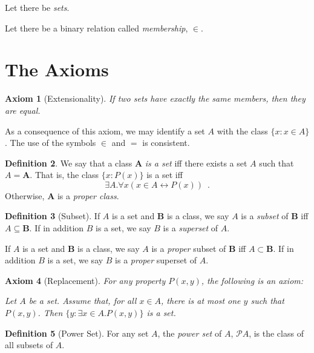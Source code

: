 \documentclass{report}
\newtheorem{axiom}{Axiom}[section]
\theoremstyle{definition}
\newtheorem{definition}[axiom]{Definition}
\begin{document}
    Let there be \emph{sets}.

    Let there be a binary relation called \emph{membership}, $\in$. 
    
    \section{The Axioms}

    \begin{axiom}[Extensionality]
        If two sets have exactly the same members, then they are equal.
    \end{axiom}

    As a consequence of this axiom, we may identify a set $A$ with the class $\{ x : x \in A \}$. The use of
    the symbols $\in$ and $=$ is consistent.

    \begin{definition}
        We say that a class $\mathbf{A}$ \emph{is a set} iff there exists a set $A$ such that $A = \mathbf{A}$.
        That is, the class $\{ x : P(x) \}$ is a set iff
        \[ \exists A. \forall x (x \in A \leftrightarrow P(x)) \enspace . \]
        Otherwise, $\mathbf{A}$ is a \emph{proper class}.
    \end{definition}

    \begin{definition}[Subset]
        If $A$ is a set and $\mathbf{B}$ is a class, we say $A$ is a \emph{subset} of $\mathbf{B}$
        iff $A \subseteq \mathbf{B}$. If in addition $B$ is a set, we say $B$ is a \emph{superset} of $A$.

        If $A$ is a set and $\mathbf{B}$ is a class, we say $A$ is a \emph{proper} subset of $\mathbf{B}$
        iff $A \subset \mathbf{B}$. If in addition $B$ is a set, we say $B$ is a \emph{proper} superset of
        $A$.
    \end{definition}

    \begin{axiom}[Replacement]
        For any property $P(x,y)$, the following is an axiom:

        Let $A$ be a set. Assume that, for all $x \in A$, there is at most one $y$ such that $P(x,y)$.
        Then $\{ y : \exists x \in A. P(x,y) \}$ is a set.
    \end{axiom}

    \begin{definition}[Power Set]
        For any set $A$, the \emph{power set} of $A$, $\mathcal{P} A$, is the class of all subsets of $A$.
    \end{definition}
\end{document}
